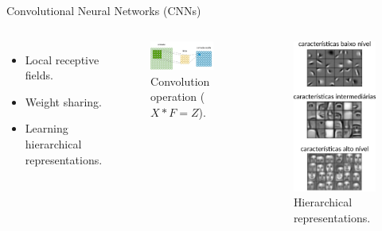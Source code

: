 \documentclass[aspectratio=169,xcolor=dvipsnames]{beamer}
\begin{document}
\begin{frame}{Convolutional Neural Networks (CNNs)}

    \begin{columns}[t]
        \begin{itemize}
            \item Local receptive fields.
            \item Weight sharing.
            \item Learning hierarchical representations.
        \end{itemize}
        \begin{figure}
            \centering
            \includegraphics[width=1\linewidth]{imgs/convolution.pdf}
            \caption{Convolution operation ($X \ast F = Z$).}
        \end{figure}

        \begin{figure}
            \centering
            \includegraphics[width=.6\linewidth]{imgs/hierarchical.png}
            \caption{Hierarchical representations.}
        \end{figure}
    \end{columns}
\end{frame}
\end{document}
